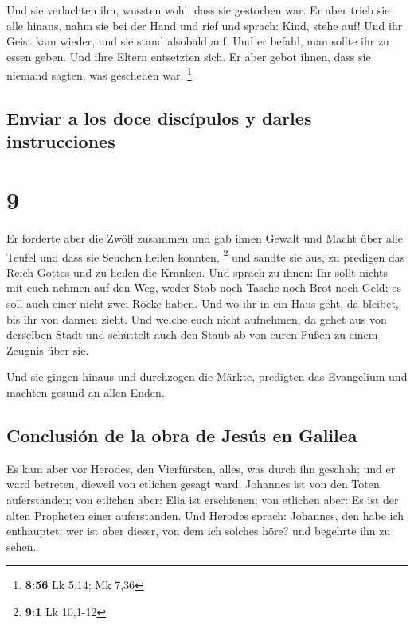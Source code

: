  Und sie verlachten ihn, wussten wohl, dass sie gestorben
war.  Er aber trieb sie alle hinaus, nahm sie bei der
Hand und rief und sprach: Kind, stehe auf!  Und ihr Geist
kam wieder, und sie stand alsobald auf. Und er befahl, man sollte ihr zu
essen geben.  Und ihre Eltern entsetzten sich. Er aber
gebot ihnen, dass sie niemand sagten, was geschehen war. \footnote{\textbf{8:56}
  Lk 5,14; Mk 7,36}

\hypertarget{enviar-a-los-doce-discuxedpulos-y-darles-instrucciones}{%
\subsection{Enviar a los doce discípulos y darles
instrucciones}\label{enviar-a-los-doce-discuxedpulos-y-darles-instrucciones}}

\hypertarget{section-8}{%
\section{9}\label{section-8}}

 Er forderte aber die Zwölf zusammen und gab ihnen Gewalt
und Macht über alle Teufel und dass sie Seuchen heilen konnten,
\footnote{\textbf{9:1} Lk 10,1-12}  und sandte sie aus, zu
predigen das Reich Gottes und zu heilen die Kranken.  Und
sprach zu ihnen: Ihr sollt nichts mit euch nehmen auf den Weg, weder
Stab noch Tasche noch Brot noch Geld; es soll auch einer nicht zwei
Röcke haben.  Und wo ihr in ein Haus geht, da bleibet, bis
ihr von dannen zieht.  Und welche euch nicht aufnehmen, da
gehet aus von derselben Stadt und schüttelt auch den Staub ab von euren
Füßen zu einem Zeugnis über sie.

 Und sie gingen hinaus und durchzogen die Märkte,
predigten das Evangelium und machten gesund an allen Enden.

\hypertarget{conclusiuxf3n-de-la-obra-de-jesuxfas-en-galilea}{%
\subsection{Conclusión de la obra de Jesús en
Galilea}\label{conclusiuxf3n-de-la-obra-de-jesuxfas-en-galilea}}

 Es kam aber vor Herodes, den Vierfürsten, alles, was
durch ihn geschah; und er ward betreten, dieweil von etlichen gesagt
ward; Johannes ist von den Toten auferstanden;  von
etlichen aber: Elia ist erschienen; von etlichen aber: Es ist der alten
Propheten einer auferstanden.  Und Herodes sprach:
Johannes, den habe ich enthauptet; wer ist aber dieser, von dem ich
solches höre? und begehrte ihn zu sehen.

